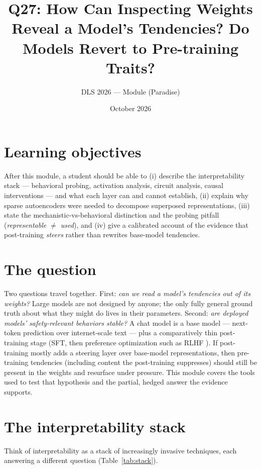 \documentclass[11pt]{article}
\title{Q27: How Can Inspecting Weights Reveal a Model's Tendencies? Do Models Revert to Pre-training Traits?}
\author{DLS 2026 --- Module (Paradise)}
\date{October 2026}
\begin{document}
\maketitle

\section*{Learning objectives}
After this module, a student should be able to (i) describe the interpretability stack --- behavioral probing, activation analysis, circuit analysis, causal interventions --- and what each layer can and cannot establish, (ii) explain why sparse autoencoders were needed to decompose superposed representations, (iii) state the mechanistic-vs-behavioral distinction and the probing pitfall (\emph{representable $\neq$ used}), and (iv) give a calibrated account of the evidence that post-training \emph{steers} rather than rewrites base-model tendencies.

\section{The question}
Two questions travel together. First: \emph{can we read a model's tendencies out of its weights?} Large models are not designed by anyone; the only fully general ground truth about what they might do lives in their parameters. Second: \emph{are deployed models' safety-relevant behaviors stable?} A chat model is a base model --- next-token prediction over internet-scale text --- plus a comparatively thin post-training stage (SFT, then preference optimization such as RLHF \cite{ouyang2022training}). If post-training mostly adds a steering layer over base-model representations, then pre-training tendencies (including content the post-training suppresses) should still be present in the weights and resurface under pressure. This module covers the tools used to test that hypothesis and the partial, hedged answer the evidence supports.

\section{The interpretability stack}
Think of interpretability as a stack of increasingly invasive techniques, each answering a different question (Table~\ref{tab:stack}).
\end{document}
